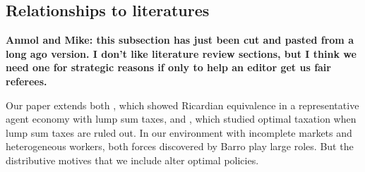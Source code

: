 \documentclass[thmsb,11pt]{article}
\begin{document}






\subsection{Relationships to literatures}
\textbf{Anmol and Mike: this subsection has just been cut and pasted from a long ago version. I don't like literature review sections, but
I think we need one for strategic reasons if only to help an editor get us fair referees.}

Our paper extends both \citet{Barro1974}, which showed Ricardian equivalence in a representative agent economy with lump sum taxes,
and \citet{Barro1979}, which studied  optimal taxation  when lump sum taxes are ruled out. In our environment with incomplete markets and heterogeneous workers,
both forces discovered by Barro play large roles.  But the distributive motives that we include alter optimal policies.
\end{document}
